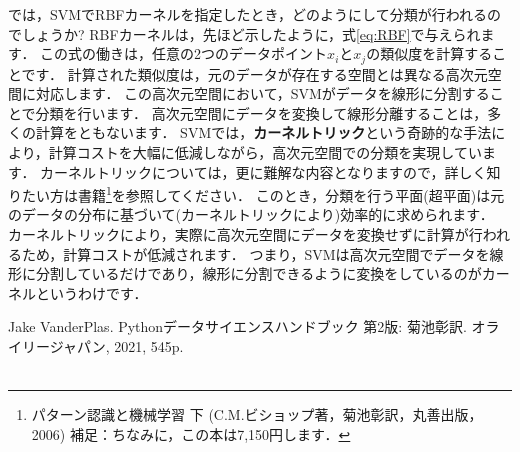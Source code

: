 \documentclass{jarticle}
\begin{document}
では，SVMでRBFカーネルを指定したとき，どのようにして分類が行われるのでしょうか?
RBFカーネルは，先ほど示したように，式\ref{eq:RBF}で与えられます．
この式の働きは，任意の2つのデータポイント$x_i$と$x_j$の類似度を計算することです．
計算された類似度は，元のデータが存在する空間とは異なる高次元空間に対応します．
この高次元空間において，SVMがデータを線形に分割することで分類を行います．
高次元空間にデータを変換して線形分離することは，多くの計算をともないます．
SVMでは，\textbf{カーネルトリック}という奇跡的な手法により，計算コストを大幅に低減しながら，高次元空間での分類を実現しています．
カーネルトリックについては，更に難解な内容となりますので，詳しく知りたい方は書籍\footnote{パターン認識と機械学習 下 (C.M.ビショップ著，菊池彰訳，丸善出版，2006) 補足：ちなみに，この本は7,150円します．}を参照してください．
このとき，分類を行う平面(超平面)は元のデータの分布に基づいて(カーネルトリックにより)効率的に求められます．
カーネルトリックにより，実際に高次元空間にデータを変換せずに計算が行われるため，計算コストが低減されます．
つまり，SVMは高次元空間でデータを線形に分割しているだけであり，線形に分割できるように変換をしているのがカーネルというわけです．

\begin{thebibliography}{99}
   Jake VanderPlas. Pythonデータサイエンスハンドブック 第2版: 菊池彰訳. オライリージャパン, 2021, 545p. \\\\
\end{thebibliography}
\end{document}
